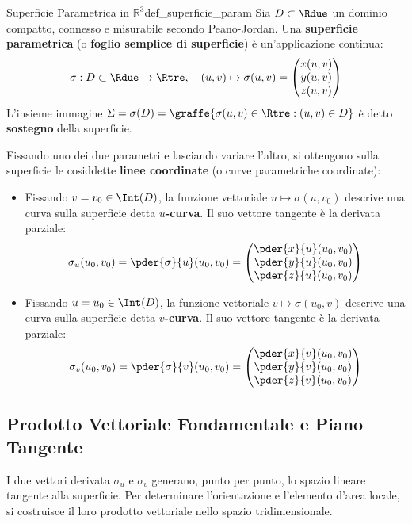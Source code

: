 \begin{definizione}{Superficie Parametrica in $\mathbb{R}^3$}{def_superficie_param}
Sia $D \subset \Rdue$ un dominio compatto, connesso e misurabile secondo Peano-Jordan. Una \textbf{superficie parametrica} (o \textbf{foglio semplice di superficie}) è un'applicazione continua:
\[
\sigma: D \subset \Rdue \to \Rtre, \quad (u,v) \mapsto \sigma(u,v) = \begin{pmatrix} x(u,v) \\ y(u,v) \\ z(u,v) \end{pmatrix}
\]
L'insieme immagine $\Sigma = \sigma(D) = \graffe{\sigma(u,v) \in \Rtre : (u,v) \in D}$ è detto \textbf{sostegno} della superficie.
\end{definizione}

Fissando uno dei due parametri e lasciando variare l'altro, si ottengono sulla superficie le cosiddette \textbf{linee coordinate} (o curve parametriche coordinate):
\begin{itemize}
    \item Fissando $v = v_0 \in \Int(D)$, la funzione vettoriale $u \mapsto \sigma(u, v_0)$ descrive una curva sulla superficie detta \textbf{$u$-curva}. Il suo vettore tangente è la derivata parziale:
    \[
    \sigma_u(u_0, v_0) = \pder{\sigma}{u}(u_0, v_0) = \begin{pmatrix} \pder{x}{u}(u_0, v_0) \\ \pder{y}{u}(u_0, v_0) \\ \pder{z}{u}(u_0, v_0) \end{pmatrix}
    \]
    \item Fissando $u = u_0 \in \Int(D)$, la funzione vettoriale $v \mapsto \sigma(u_0, v)$ descrive una curva sulla superficie detta \textbf{$v$-curva}. Il suo vettore tangente è la derivata parziale:
    \[
    \sigma_v(u_0, v_0) = \pder{\sigma}{v}(u_0, v_0) = \begin{pmatrix} \pder{x}{v}(u_0, v_0) \\ \pder{y}{v}(u_0, v_0) \\ \pder{z}{v}(u_0, v_0) \end{pmatrix}
    \]
\end{itemize}

\subsection{Prodotto Vettoriale Fondamentale e Piano Tangente}

I due vettori derivata $\sigma_u$ e $\sigma_v$ generano, punto per punto, lo spazio lineare tangente alla superficie. Per determinare l'orientazione e l'elemento d'area locale, si costruisce il loro prodotto vettoriale nello spazio tridimensionale.

